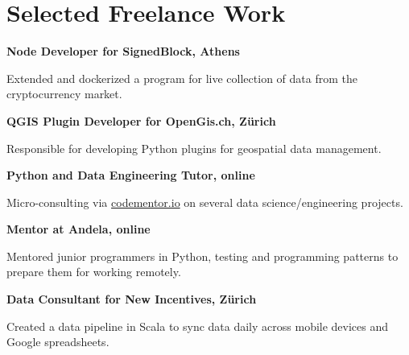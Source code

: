\documentclass[10pt]{article} %
\begin{document}
\begin{minipage}[t]{0.5\textwidth} %
\vspace{0pt} %
	


\section{Selected Freelance Work} 


{\raggedright\large \textbf{Node Developer for SignedBlock, Athens}\\
}

\normalsize{Extended and dockerized a program for live collection of data from the cryptocurrency market.}
\\

{\raggedright\large \textbf{QGIS Plugin Developer for OpenGis.ch, Z\"urich}\\
}

\normalsize{Responsible for developing Python plugins for geospatial data management.}\\

{\raggedright\large \textbf{Python and Data Engineering Tutor, online}\\
}

\normalsize{Micro-consulting via \href{http://www.codementor.io/carolinux}{codementor.io} on several data science/engineering projects.}\\

{\raggedright\large \textbf{Mentor at Andela, online}\\
}

\normalsize{Mentored junior programmers in Python, testing and programming patterns to prepare them for working remotely.} 
\\

{\raggedright\large \textbf{Data Consultant for New Incentives, Z\"urich}\\
}

\normalsize{Created a data pipeline in Scala to sync data daily across mobile devices and Google spreadsheets.}\\



\end{minipage}
\end{document}
